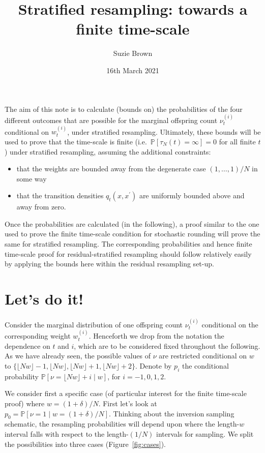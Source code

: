 \documentclass[fleqn]{article}
\title{Stratified resampling: towards a finite time-scale}
\author{Suzie Brown}
\date{16th March 2021}
\newcommand{\Prob}{\mathbb{P}}
\newcommand{\flnw}{\lfloor N w \rfloor}
\begin{document}
\maketitle
\thispagestyle{fancy}

The aim of this note is to calculate (bounds on) the probabilities of the four different outcomes that are possible for the marginal offspring count $\nu_t^{(i)}$ conditional on $w_t^{(i)}$, under stratified resampling.
Ultimately, these bounds will be used to prove that the time-scale is finite
(i.e.\ $\Prob[\tau_N(t)=\infty]=0$ for all finite $t$)
under stratified resampling, assuming the additional constraints:
\begin{itemize}
\item that the weights are bounded away from the degenerate case $(1,\dots,1)/N$ in some way
\item that the transition densities $q_t(x,x^\prime)$ are uniformly bounded above and away from zero.
\end{itemize}
Once the probabilities are calculated (in the following), a proof similar to the one used to prove the finite time-scale condition for stochastic rounding will prove the same for stratified resampling.
The corresponding probabilities and hence finite time-scale proof for residual-stratified resampling should follow relatively easily by applying the bounds here within the residual resampling set-up.


\section*{Let's do it!}
Consider the marginal distribution of one offspring count $\nu_t^{(i)}$ conditional on the corresponding weight $w_t^{(i)}$. Henceforth we drop from the notation the dependence on $t$ and $i$, which are to be considered fixed throughout the following.
As we have already seen, the possible values of $\nu$ are restricted conditional on $w$ to $\{ \flnw-1, \flnw, \flnw+1, \flnw+2 \}$. Denote by $p_i$ the conditional probability $\Prob[ \nu = \flnw + i \mid w ]$, for $i = -1,0,1,2$.

We consider first a specific case (of particular interest for the finite time-scale proof) where $w= (1+\delta)/N$. 
First let's look at $p_0 = \Prob[ \nu = 1 \mid w = (1+\delta)/N ]$.
Thinking about the inversion sampling schematic, %
the resampling probabilities will depend upon where the length-$w$ interval falls with respect to the length-$(1/N)$ intervals for sampling. We split the possibilities into three cases (Figure~\ref{fig:cases}).
\end{document}
